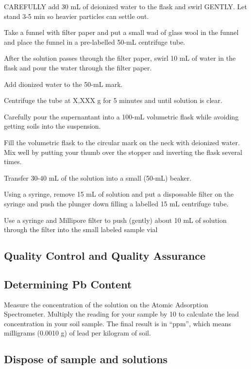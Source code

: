 \documentclass[12pt]{../SOP3_alpha}
\begin{document}
\NP CAREFULLY add 30 mL of deionized water to the flask and swirl GENTLY. Let stand 3-5 min so heavier particles can  settle out.

\NP Take a funnel with filter paper and put a small wad of glass wool in the funnel and place the funnel in a pre-labelled 50-mL centrifuge tube. 

\NP After the solution passes through the filter paper, swirl 10 mL of water in the flask and pour the water through the filter paper. 

\NP Add dionized water to the 50-mL mark.

\NP Centrifuge the tube at X,XXX g for 5 minutes and until solution is clear. 

\NP Carefully pour the supernantant into a 100-mL volumetric flask while avoiding getting soils into the suspension. 

\NP Fill the volumetric flask to the circular mark on the neck with deionized water. Mix well by putting your thumb over the stopper and inverting the flask several times. 

\NP Transfer 30-40 mL of the solution into a small (50-mL) beaker.

\NP Using a syringe, remove 15 mL of solution and put a dispossable filter on the syringe and push the plunger down filling a labelled 15 mL centrifuge tube. 

\NP Use a syringe and Millipore filter to push (gently) about 10 mL of solution through the filter into the small labeled sample vial

\subsection{Quality Control and Quality Assurance}

\subsection{Determining Pb Content}

\NP Measure the concentration of the solution on the Atomic Adsorption Spectrometer.  Multiply the reading for your sample by 10 to calculate the lead concentration in your soil sample.  The final result is in “ppm”, which means milligrams (0.0010 g) of lead per kilogram of soil.

\subsection{Dispose of sample and solutions}
\end{document}
